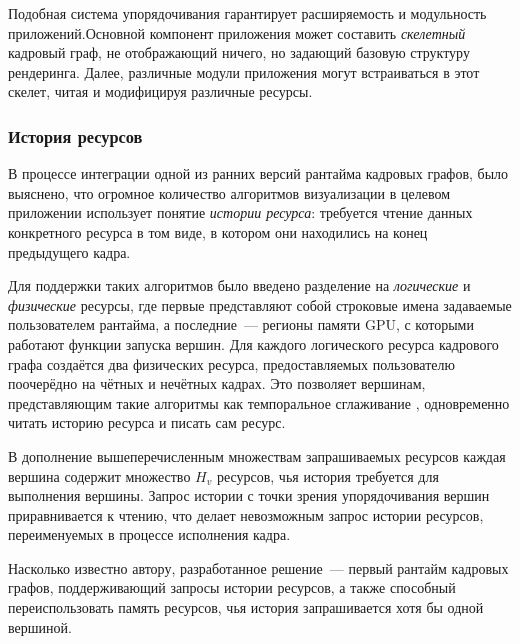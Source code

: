 Подобная система упорядочивания гарантирует расширяемость и модульность приложений.Основной компонент приложения может составить \textit{скелетный} кадровый граф, не отображающий ничего, но задающий базовую структуру рендеринга.
Далее, различные модули приложения могут встраиваться в этот скелет, читая и модифицируя различные ресурсы.

\subsubsection{История ресурсов}
В процессе интеграции одной из ранних версий рантайма кадровых графов, было выяснено, что огромное количество алгоритмов визуализации в целевом приложении использует понятие \textit{истории ресурса}: требуется чтение данных конкретного ресурса в том виде, в котором они находились на конец предыдущего кадра.

Для поддержки таких алгоритмов было введено разделение на \textit{логические} и \textit{физические} ресурсы, где первые представляют собой строковые имена задаваемые пользователем рантайма, а последние~--- регионы памяти GPU, с которыми работают функции запуска вершин.
Для каждого логического ресурса кадрового графа создаётся два физических ресурса, предоставляемых пользователю поочерёдно на чётных и нечётных кадрах.
Это позволяет вершинам, представляющим такие алгоритмы как темпоральное сглаживание \cite{yang2020survey}, одновременно читать историю ресурса и писать сам ресурс.

В дополнение вышеперечисленным множествам запрашиваемых ресурсов каждая вершина содержит множество $H_v$ ресурсов, чья история требуется для выполнения вершины.
Запрос истории с точки зрения упорядочивания вершин приравнивается к чтению, что делает невозможным запрос истории ресурсов, переименуемых в процессе исполнения кадра.

Насколько известно автору, разработанное решение~--- первый рантайм кадровых графов, поддерживающий запросы истории ресурсов, а также способный переиспользовать память ресурсов, чья история запрашивается хотя бы одной вершиной.

